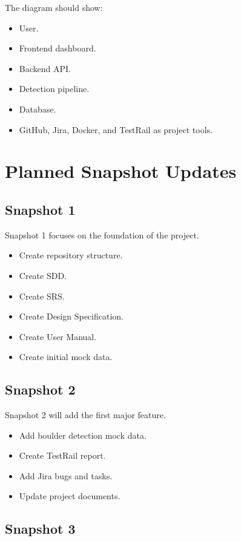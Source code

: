 \documentclass[12pt]{article}
\begin{document}
The diagram should show:

\begin{itemize}
    \item User.
    \item Frontend dashboard.
    \item Backend API.
    \item Detection pipeline.
    \item Database.
    \item GitHub, Jira, Docker, and TestRail as project tools.
\end{itemize}

\section{Planned Snapshot Updates}

\subsection{Snapshot 1}

Snapshot 1 focuses on the foundation of the project.

\begin{itemize}
    \item Create repository structure.
    \item Create SDD.
    \item Create SRS.
    \item Create Design Specification.
    \item Create User Manual.
    \item Create initial mock data.
\end{itemize}

\subsection{Snapshot 2}

Snapshot 2 will add the first major feature.

\begin{itemize}
    \item Add boulder detection mock data.
    \item Create TestRail report.
    \item Add Jira bugs and tasks.
    \item Update project documents.
\end{itemize}

\subsection{Snapshot 3}
\end{document}
